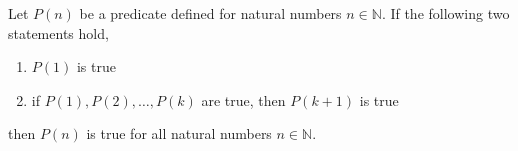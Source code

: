 \vspace{\baselineskip}
\begin{theorem}
	Let $P(n)$ be a predicate defined for natural numbers $n \in \mathbb{N}$. If the following two statements hold,
	
	\vspace{\baselineskip}
	\begin{enumerate}
		\item $P(1)$ is true
		\item if $P(1), P(2), \dots, P(k)$ are true, then $P(k + 1)$ is true
	\end{enumerate}
	\vspace{\baselineskip}

	then $P(n)$ is true for all natural numbers $n \in \mathbb{N}$.
\end{theorem}
